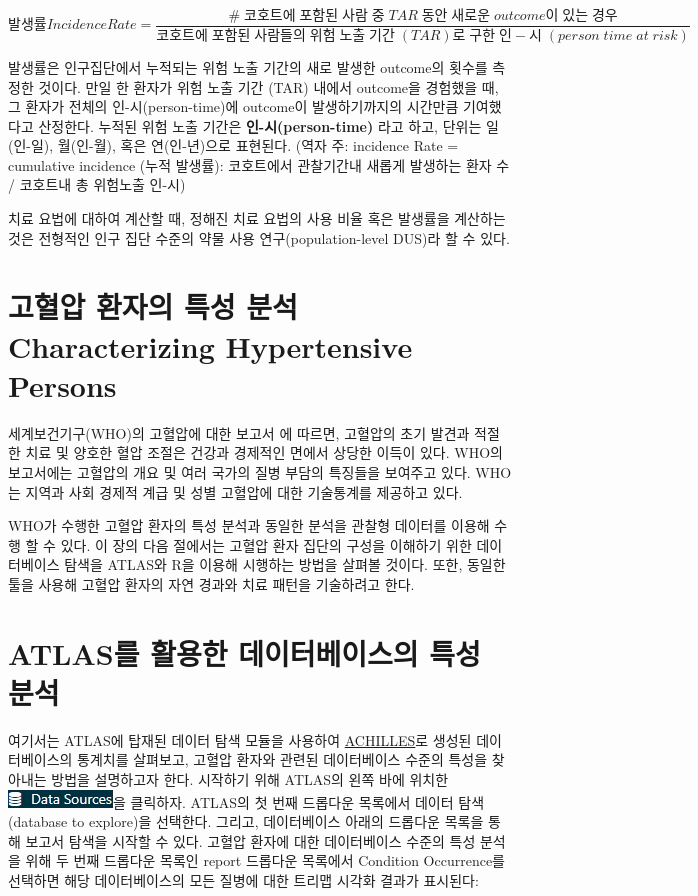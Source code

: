 \documentclass[11pt]{book}
\theoremstyle{definition}
\theoremstyle{definition}
\theoremstyle{definition}
\theoremstyle{remark}
\begin{document}
\[
발생률 Incidence Rate= \frac{\#\;코호트에\;포함된\;사람\;중\;TAR\;동안\;새로운\;outcome이\;있는\;경우}{코호트에\;포함된\;사람들의\;위험\;노출\;기간\;(TAR)로\;구한\;인-시\;(person\;time\;at\;risk)}
\]

발생률은 인구집단에서 누적되는 위험 노출 기간의 새로 발생한 outcome의
횟수를 측정한 것이다. 만일 한 환자가 위험 노출 기간 (TAR) 내에서
outcome을 경험했을 때, 그 환자가 전체의 인-시(person-time)에 outcome이
발생하기까지의 시간만큼 기여했다고 산정한다. 누적된 위험 노출 기간은
\textbf{인-시(person-time)} 라고 하고, 단위는 일(인-일), 월(인-월), 혹은
연(인-년)으로 표현된다.   (역자
주: incidence Rate = cumulative incidence (누적 발생률): 코호트에서
관찰기간내 새롭게 발생하는 환자 수 / 코호트내 총 위험노출 인-시)

치료 요법에 대하여 계산할 때, 정해진 치료 요법의 사용 비율 혹은 발생률을
계산하는 것은 전형적인 인구 집단 수준의 약물 사용 연구(population-level
DUS)라 할 수 있다.

\section{고혈압 환자의 특성 분석 Characterizing Hypertensive
Persons}\label{----characterizing-hypertensive-persons}

세계보건기구(WHO)의 고혈압에 대한 보고서 \citep{WHOHypertension} 에
따르면, 고혈압의 초기 발견과 적절한 치료 및 양호한 혈압 조절은 건강과
경제적인 면에서 상당한 이득이 있다. WHO의 보고서에는 고혈압의 개요 및
여러 국가의 질병 부담의 특징들을 보여주고 있다. WHO는 지역과 사회 경제적
계급 및 성별 고혈압에 대한 기술통계를 제공하고 있다.

WHO가 수행한 고혈압 환자의 특성 분석과 동일한 분석을 관찰형 데이터를
이용해 수행 할 수 있다. 이 장의 다음 절에서는 고혈압 환자 집단의 구성을
이해하기 위한 데이터베이스 탐색을 ATLAS와 R을 이용해 시행하는 방법을
살펴볼 것이다. 또한, 동일한 툴을 사용해 고혈압 환자의 자연 경과와 치료
패턴을 기술하려고 한다.

\section{ATLAS를 활용한 데이터베이스의 특성 분석}\label{atlas----}

여기서는 ATLAS에 탑재된 데이터 탐색 모듈을 사용하여
\href{https://github.com/OHDSI/Achilles}{ACHILLES}로 생성된
데이터베이스의 통계치를 살펴보고, 고혈압 환자와 관련된 데이터베이스
수준의 특성을 찾아내는 방법을 설명하고자 한다. 시작하기 위해 ATLAS의
왼쪽 바에 위치한
\includegraphics{images/Characterization/atlasDataSourcesMenuItem.png}을
클릭하자. ATLAS의 첫 번째 드롭다운 목록에서 데이터 탐색(database to
explore)을 선택한다. 그리고, 데이터베이스 아래의 드롭다운 목록을 통해
보고서 탐색을 시작할 수 있다. 고혈압 환자에 대한 데이터베이스 수준의
특성 분석을 위해 두 번째 드롭다운 목록인 report 드롭다운 목록에서
Condition Occurrence를 선택하면 해당 데이터베이스의 모든 질병에 대한
트리맵 시각화 결과가 표시된다:
\end{document}

